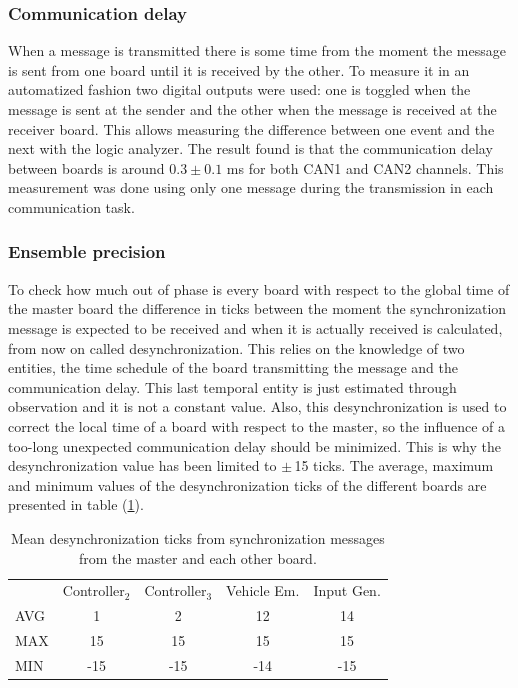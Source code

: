 \documentclass[table,xcdraw]{article}
\begin{document}
\subsubsection{Communication delay}
When a message is transmitted there is some time from the moment the message is sent from one board until it is received by the other. To measure it in an automatized fashion two digital outputs were used: one is toggled when the message is sent at the sender and the other when the message is received at the receiver board. This allows measuring the difference between one event and the next with the logic analyzer. The result found is that the communication delay between boards is around $0.3 \pm 0.1$ ms for both CAN1 and CAN2 channels. This measurement was done using only one message during the transmission in each communication task.


\subsubsection{Ensemble precision}
To check how much out of phase is every board with respect to the global time of the master board the difference in ticks between the moment the synchronization message is expected to be received and when it is actually received is calculated, from now on called desynchronization. This relies on the knowledge of two entities, the time schedule of the board transmitting the message and the communication delay. This last temporal entity is just estimated through observation and it is not a constant value. Also, this desynchronization is used to correct the local time of a board with respect to the master, so the influence of a too-long unexpected communication delay should be minimized. This is why the desynchronization value has been limited to $\pm\,$15 ticks. The average, maximum and minimum values of the desynchronization ticks of the different boards are presented in table (\ref{tab:desync}).

\begin{table}[h!]
\centering
\begin{tabular}{lcccc}
 & \multicolumn{1}{l}{Controller$_2$} & \multicolumn{1}{l}{Controller$_3$} & \multicolumn{1}{l}{Vehicle Em.} & \multicolumn{1}{l}{Input Gen.} \\
AVG & 1 & 2 & 12 & 14 \\
MAX & 15 & 15 & 15 & 15 \\
MIN & -15 & -15 & -14 & -15
\end{tabular}
\caption{Mean desynchronization ticks from synchronization messages from the master and each other board.}
\label{tab:desync}
\end{table}
\end{document}
